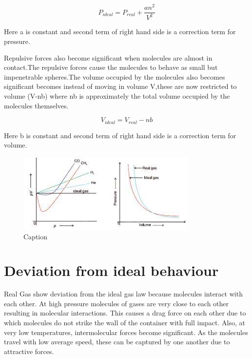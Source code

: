 \documentclass[12pt,a4paper]{article}
\begin{document}
\begin{equation}
    P_{ideal} = P_{real} + \frac{an^2}{V^2}
    \label{precorrection}
\end{equation}

Here a is constant and second term of right hand side is a correction term for pressure.

Repulsive forces also become significant when molecules are almost in contact.The repulsive forces cause the molecules to behave as small but impenetrable spheres.The volume occupied by the molecules also becomes significant becomes instead of moving in volume V,these are now restricted to volume (V-nb) where nb is approximately the total volume occupied by the molecules themselves.

\begin{equation}
    V_{ideal} = V_{real} - nb
    \label{volcorrection}
\end{equation}

Here b is constant and second term of right hand side is a correction term for volume.

\begin{figure}
    \centering
    \includegraphics[width=\linewidth]{download.png}
    \caption{Caption}
    \label{fig:enter-label}
\end{figure}

\section{Deviation from ideal behaviour}
Real Gas show deviation from the ideal gas law because molecules interact with each other. At high pressure molecules of gases are very close to each other resulting in molecular interactions. This causes a drag force on each other due to which molecules do not strike the wall of the container with full impact. Also, at very low temperatures, intermolecular forces become significant. As the molecules travel with low average speed, these can be captured by one another due to attractive forces.
\end{document}
